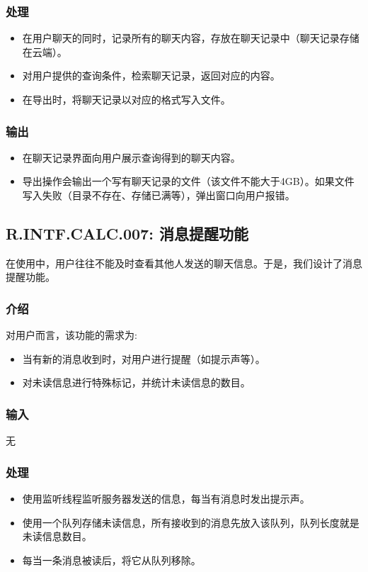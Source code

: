 \subsubsection{处理}
\begin{itemize}
  \item 在用户聊天的同时，记录所有的聊天内容，存放在聊天记录中（聊天记录存储在云端）。
  \item 对用户提供的查询条件，检索聊天记录，返回对应的内容。
  \item 在导出时，将聊天记录以对应的格式写入文件。
\end{itemize}
\subsubsection{输出}
\begin{itemize}
  \item 在聊天记录界面向用户展示查询得到的聊天内容。
  \item 导出操作会输出一个写有聊天记录的文件（该文件不能大于4GB）。如果文件写入失败（目录不存在、存储已满等），弹出窗口向用户报错。
\end{itemize}

\subsection{R.INTF.CALC.007: 消息提醒功能}
在使用中，用户往往不能及时查看其他人发送的聊天信息。于是，我们设计了消息提醒功能。
\subsubsection{介绍}
对用户而言，该功能的需求为:
\begin{itemize}
  \item 当有新的消息收到时，对用户进行提醒（如提示声等）。
  \item 对未读信息进行特殊标记，并统计未读信息的数目。
\end{itemize}
\subsubsection{输入}
无
\subsubsection{处理}
\begin{itemize}
  \item 使用监听线程监听服务器发送的信息，每当有消息时发出提示声。
  \item 使用一个队列存储未读信息，所有接收到的消息先放入该队列，队列长度就是未读信息数目。
  \item 每当一条消息被读后，将它从队列移除。
\end{itemize}

